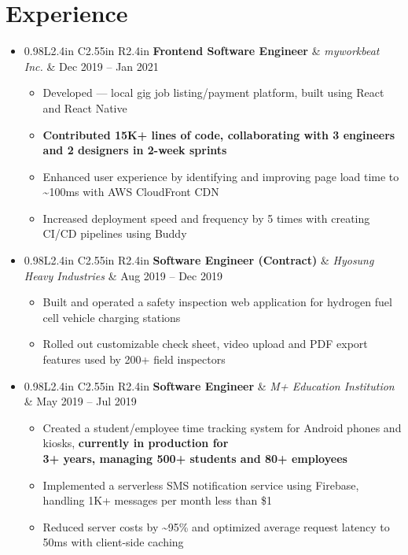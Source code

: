 \documentclass[letterpaper,11pt]{article}
\newcommand{\myuline}[1]{%
  \uline{\phantom{#1}}%
  \llap{\contour{white}{#1}}%
}
\newcommand{\resumeItem}[1]{
  \item\small{
    {#1 \vspace{-2pt}}
  }
}
\newcommand{\resumeEntry}[3]{
  \item
    \begin{tabular*}{0.98\textwidth}{L{2.4in} C{2.55in} R{2.4in}}
      \hspace{-1.5pt}\textbf{#1} & \textit{\small#2} & {#3} \\
    \end{tabular*}\vspace{-5.5pt}
}
\newcommand{\resumeSubHeadingListStart}{\begin{itemize}[leftmargin=0.1in, label={}]}
\newcommand{\resumeSubHeadingListEnd}{\end{itemize}}
\newcommand{\resumeItemListStart}{\begin{itemize}[leftmargin=0.22in]}
\newcommand{\resumeItemListEnd}{\end{itemize}\vspace{-5.7pt}}
\begin{document}
\section{Experience}
  \resumeSubHeadingListStart

    \resumeEntry
      {Frontend Software Engineer}{myworkbeat Inc.}{Dec 2019 -- Jan 2021}
      \resumeItemListStart
        \resumeItem{Developed \href{https://apple.co/3La39ZX}{\myuline{\textbf{sugosugo}}} --- local gig job listing/payment platform, built using React and React Native}
        \resumeItem{\textbf{Contributed 15K+ lines of code, collaborating with 3 engineers and 2 designers in 2-week sprints}}
        \resumeItem{Enhanced user experience by identifying and improving page load time to \textasciitilde{}100ms with AWS CloudFront CDN}
        \resumeItem{Increased deployment speed and frequency by 5 times with creating CI/CD pipelines using Buddy}
      \resumeItemListEnd

    \resumeEntry
      {Software Engineer (Contract)}{Hyosung Heavy Industries}{Aug 2019 -- Dec 2019}
      \resumeItemListStart
        \resumeItem{Built and operated a safety inspection web application for hydrogen fuel cell vehicle charging stations}
        \resumeItem{Rolled out customizable check sheet, video upload and PDF export features used by 200+ field inspectors}
      \resumeItemListEnd

    \resumeEntry
      {Software Engineer}{M+ Education Institution}{May 2019 -- Jul 2019}
      \resumeItemListStart
        \resumeItem{Created a student/employee time tracking system for Android phones and kiosks, \textbf{currently in production for \\ 3+ years, managing 500+ students and 80+ employees}}
        \resumeItem{Implemented a serverless SMS notification service using Firebase, handling 1K+ messages per month less than \$1}
        \resumeItem{Reduced server costs by \textasciitilde{}95\% and optimized average request latency to 50ms with client-side caching}
      \resumeItemListEnd


  \resumeSubHeadingListEnd
\end{document}
